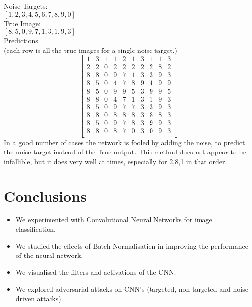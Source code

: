 \documentclass[11pt, a4paper]{article}
\begin{document}
Noise Targets:\\
$[1, 2, 3, 4, 5, 6, 7, 8, 9, 0]$\\
True Image:\\
$[8, 5, 0, 9, 7, 1, 3, 1, 9, 3]$\\
Predictions\\
(each row is all the true images for a single noise target.)\\
$$
 \begin{bmatrix} 
1 & 3 & 1 & 1 & 2 & 1 & 3 & 1 & 1 & 3 \\
2 & 2 & 0 & 2 & 2 & 2 & 2 & 2 & 8 & 2 \\
8 & 8 & 0 & 9 & 7 & 1 & 3 & 3 & 9 & 3 \\
8 & 5 & 0 & 4 & 7 & 8 & 9 & 4 & 9 & 9 \\
8 & 5 & 0 & 9 & 9 & 5 & 3 & 9 & 9 & 5 \\
8 & 8 & 0 & 4 & 7 & 1 & 3 & 1 & 9 & 3 \\
8 & 5 & 0 & 9 & 7 & 7 & 3 & 3 & 9 & 3 \\
8 & 8 & 0 & 8 & 8 & 8 & 3 & 8 & 8 & 3 \\
8 & 5 & 0 & 9 & 7 & 8 & 3 & 9 & 9 & 3 \\
8 & 8 & 0 & 8 & 7 & 0 & 3 & 0 & 9 & 3 \\
  \end{bmatrix}
 $$
In a good number of cases the network is fooled by adding the noise, to predict the noise target instead of the True output. This method does not appear to be infallible, but it does very well at times, especially for 2,8,1 in that order.
\section{Conclusions}
\begin{itemize}
\item We experimented with Convolutional Neural Networks for image classification.
\item We studied the effects of Batch Normalisation in improving the performance of the neural network.
\item We visualised the filters and activations of the CNN.
\item We explored adversarial attacks on CNN's (targeted, non targeted and noise driven attacks).
\end{itemize}



 

\end{document}
